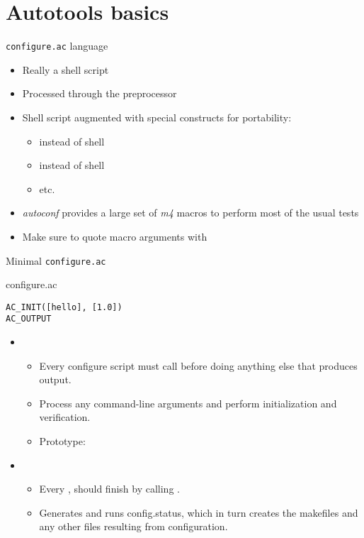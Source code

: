 \section{Autotools basics}

\begin{frame}{{\tt configure.ac} language}
  \begin{itemize}
  \item Really a shell script
  \item Processed through the  preprocessor
  \item Shell script augmented with special constructs for portability:
    \begin{itemize}
    \item {} instead of shell 
    \item {} instead of shell 
    \item etc.
    \end{itemize}
  \item {\em autoconf} provides a large set of {\em m4} macros to
    perform most of the usual tests
  \item Make sure to quote macro arguments with \code{[]}
  \end{itemize}
\end{frame}

\begin{frame}[fragile]{Minimal {\tt configure.ac}}
  \begin{block}{configure.ac}
  \begin{verbatim}
AC_INIT([hello], [1.0])
AC_OUTPUT
  \end{verbatim}
  \end{block}
  \begin{itemize}
  \item {}
    \begin{itemize}
    \item Every configure script must call  before doing
      anything else that produces output.
    \item Process any command-line arguments and perform
      initialization and verification.
    \item Prototype:\\
    \end{itemize}
  \item {}
    \begin{itemize}
    \item Every , should finish by calling
      .
    \item Generates and runs config.status, which in turn creates the
      makefiles and any other files resulting from configuration.
    \end{itemize}
  \end{itemize}
\end{frame}


